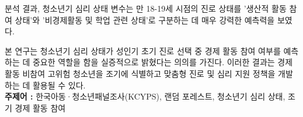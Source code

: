 \begin{center}
  분석 결과, 청소년기 심리 상태 변수는 만 18-19세 시점의 진로 상태를 '생산적 활동 참여 상태'와 '비경제활동 및 학업 관련 상태'로 구분하는 데 매우 강력한 예측력을 보였다.

  본 연구는 청소년기 심리 상태가 성인기 초기 진로 선택 중 경제 활동 참여 여부를 예측하는 데 중요한 역할을 함을 실증적으로 밝혔다는 의의를 가진다. 이러한 결과는 경제 활동 비참여 고위험 청소년을 조기에 식별하고 맞춤형 진로 및 심리 지원 정책을 개발하는 데 활용될 수 있다.
  \vspace{0.5em}
  \\
  \noindent\textbf{주제어 :} 한국아동·청소년패널조사(KCYPS), 랜덤 포레스트, 청소년기 심리 상태, 조기 경제 활동 참여

  \vspace{1em}

\end{center}
